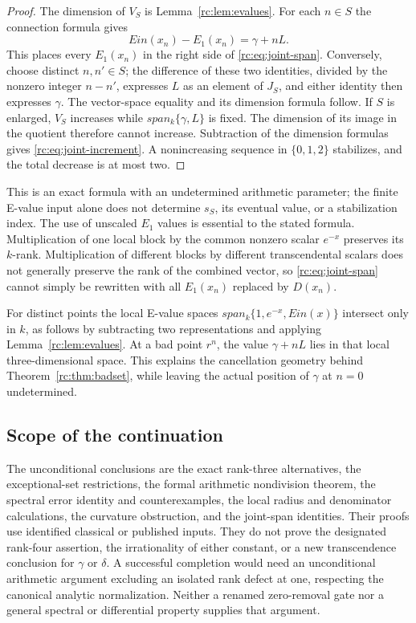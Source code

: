 \documentclass[11pt,a4paper]{article}
\theoremstyle{definition}
\theoremstyle{remark}
\theoremstyle{plain}
\numberwithin{equation}{section}
\def\operatorname#1{#1}\def\mathrm#1{#1}}
\providecommand{\rcEin}{\operatorname{Ein}}
\providecommand{\rcSpan}{\operatorname{span}}
\begin{document}
\begin{proof}
The dimension of $V_S$ is Lemma~\ref{rc:lem:evalues}.  For each
$n\in S$ the connection formula gives
\[
 \rcEin(x_n)-E_1(x_n)=\gamma+nL.
\]
This places every $E_1(x_n)$ in the right side of
\eqref{rc:eq:joint-span}.  Conversely, choose distinct $n,n'\in S$;
the difference of these two identities, divided by the nonzero integer
$n-n'$, expresses $L$ as an element of $J_S$, and either identity then
expresses $\gamma$.  The vector-space equality and its dimension formula
follow.  If $S$ is enlarged, $V_S$ increases while
$\rcSpan_k\{\gamma,L\}$ is fixed.  The dimension of its image in the
quotient therefore cannot increase.  Subtraction of the dimension
formulas gives \eqref{rc:eq:joint-increment}.  A nonincreasing sequence
in $\{0,1,2\}$ stabilizes, and the total decrease is at most two.
\end{proof}

This is an exact formula with an undetermined arithmetic parameter; the
finite E-value input alone does not determine $s_S$, its eventual value,
or a stabilization index.  The use of unscaled $E_1$ values is essential
to the stated formula.  Multiplication of one local block by the common
nonzero scalar $e^{-x}$ preserves its $k$-rank.  Multiplication of
different blocks by different transcendental scalars does not generally
preserve the rank of the combined vector, so
\eqref{rc:eq:joint-span} cannot simply be rewritten with all $E_1(x_n)$
replaced by $D(x_n)$.

For distinct points the local E-value spaces
$\rcSpan_k\{1,e^{-x},\rcEin(x)\}$ intersect only in $k$, as follows
by subtracting two representations and applying
Lemma~\ref{rc:lem:evalues}.  At a bad point $r^n$, the value
$\gamma+nL$ lies in that local three-dimensional space.  This explains
the cancellation geometry behind Theorem~\ref{rc:thm:badset}, while
leaving the actual position of $\gamma$ at $n=0$ undetermined.

\subsection{Scope of the continuation}

The unconditional conclusions are the exact rank-three alternatives,
the exceptional-set restrictions, the formal arithmetic nondivision
theorem, the spectral error identity and counterexamples, the local
radius and denominator calculations, the curvature obstruction, and
the joint-span identities.  Their proofs use identified classical or
published inputs.  They do not prove the designated rank-four assertion,
the irrationality of either constant, or a new transcendence conclusion
for $\gamma$ or $\delta$.  A successful completion would need an
unconditional arithmetic argument excluding an isolated rank defect at
one, respecting the canonical analytic normalization.  Neither a renamed
zero-removal gate nor a general spectral or differential property
supplies that argument.
\end{document}
